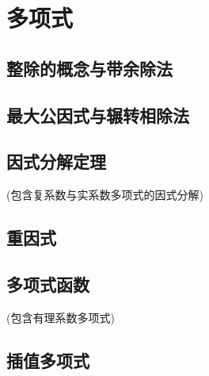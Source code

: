 
\section{多项式}
\label{sec:polynome}

\subsection{整除的概念与带余除法}
\label{sec:polynome-integer-division-and-devision-with-remainder}

\subsection{最大公因式与辗转相除法}
\label{sec:greatest-common-divisor-and-euclidean-division}

\subsection{因式分解定理}
\label{sec:factoring-theorem}

(包含复系数与实系数多项式的因式分解)

\subsection{重因式}
\label{sec:mulitple-factor}

\subsection{多项式函数}
\label{sec:polynome-function}

(包含有理系数多项式)

\subsection{插值多项式}
\label{sec:interpolation-polynome}






